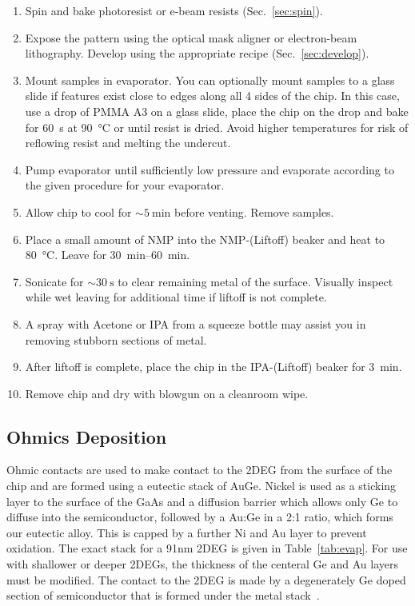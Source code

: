 
\begin{enumerate}
    \item Spin and bake photoresist or e-beam resists (Sec.~\ref{sec:spin}).
    \item Expose the pattern using the optical mask aligner or electron-beam lithography. Develop using the appropriate recipe (Sec.~\ref{sec:develop}).
    \item Mount samples in evaporator. You can optionally mount samples to a glass slide if features exist close to edges along all 4 sides of the chip. In this case, use a drop of PMMA A3 on a glass slide, place the chip on the drop and bake for \SI{60}{\second} at \SI{90}{\celsius} or until resist is dried. Avoid higher temperatures for risk of reflowing resist and melting the undercut.
    \item Pump evaporator until sufficiently low pressure and evaporate according to the given procedure for your evaporator.
    \item Allow chip to cool for $\sim \SI{5}{\minute}$ before venting. Remove samples.
    \item Place a small amount of NMP into the NMP-(Liftoff) beaker and heat to \SI{80}{\celsius}. Leave for \SIrange{30}{60}{\minute}.
    \item Sonicate for $\sim \SI{30}{\second}$ to clear remaining metal of the surface. Visually inspect while wet leaving for additional time if liftoff is not complete.
    \item A spray with Acetone or IPA from a squeeze bottle may assist you in removing stubborn sections of metal.
    \item After liftoff is complete, place the chip in the IPA-(Liftoff) beaker for \SI{3}{\minute}.
    \item Remove chip and dry with  blowgun on a cleanroom wipe.
\end{enumerate}

\subsection{Ohmics Deposition}
\label{sec:ohmics}
Ohmic contacts are used to make contact to the 2DEG from the surface of the chip and are formed using a eutectic stack
of AuGe. Nickel is used as a sticking layer to the surface of the GaAs and a diffusion barrier which allows only Ge to diffuse
into the semiconductor, followed by a Au:Ge in a 2:1 ratio, which forms our eutectic alloy. This is capped by a further Ni and
Au layer to prevent oxidation. The exact stack for a 91nm 2DEG is given in Table~\ref{tab:evap}. For use with shallower or
deeper 2DEGs, the thickness of the centeral Ge and Au layers must be modified. The contact to the 2DEG is made by a degenerately
Ge doped section of semiconductor that is formed under the metal stack~\cite{RELLING1989380,PIOTROWSKA1983179}.

